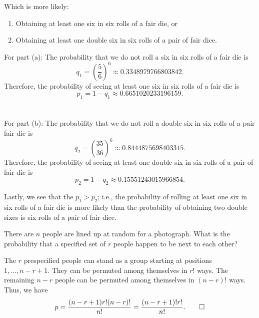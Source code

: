 \begin{problem}[Handout 1, \# 12]
  Which is more likely:
  \begin{enumerate}[label=(\alph*),noitemsep]
  \item Obtaining at least one six in six rolls of a fair die, or
  \item Obtaining at least one double six in six rolls of a pair of fair
    dice.
  \end{enumerate}
\end{problem}
\begin{solution*}
  For part (a): The probability that we do not roll a six in six rolls of a
  fair die is
  \[
    q_1=\left(\frac{5}{6}\right)^6\approx\num{0.3348979766803842}.
  \]
  Therefore, the probability of seeing at least one six in six rolls of a
  fair die is
  \[
    p_1=1-q_1\approx\num{0.6651020233196159}.
  \]
  \\\\
  For part (b): The probability that we do not roll a double six in six
  rolls of a pair fair die is
  \[
    q_2=\left(\frac{35}{36}\right)^6\approx\num{0.8444875698403315}.
  \]
  Therefore, the probability of seeing at least one double six in six rolls
  of a pair of fair die is
  \[
    p_2=1-q_2\approx\num{0.15551243015966854}.
  \]

  Lastly, we see that the \(p_1>p_2\); i.e., the probability of rolling at
  least one six in six rolls of a fair die is more likely than the
  probability of obtaining two double sixes is six rolls of a pair of fair
  dice.
\end{solution*}

\begin{problem}[Handout 1, \# 13]
  There are \(n\) people are lined up at random for a photograph. What is
  the probability that a specified set of \(r\) people happen to be next to
  each other?
\end{problem}
\begin{solution*}
  The \(r\) prespecified people can stand as a group starting at positions
  \(1,\dotsc,n-r+1\). They can be permuted among themselves in \(r!\)
  ways. The remaining \(n-r\) people can be permuted among themselves in
  \((n-r)!\) ways. Thus, we have
  \[
    p=\frac{(n-r+1)r!(n-r)!}{n!}=\frac{(n-r+1)!r!}{n!}.\qedhere
  \]
\end{solution*}

